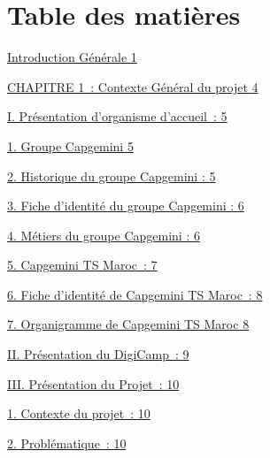 \documentclass[12pt,a4paper,twoside]{report}
\begin{document}
\hypertarget{table-des-matiuxe8res}{%
\section{Table des matières}\label{table-des-matiuxe8res}}

\protect\hyperlink{introduction-guxe9nuxe9rale}{Introduction Générale
\protect\hyperlink{introduction-guxe9nuxe9rale}{1}}

\protect\hyperlink{section}{CHAPITRE 1~: Contexte Général du projet
\protect\hyperlink{section}{4}}

\protect\hyperlink{pruxe9sentation-dorganisme-daccueil}{I. Présentation
d'organisme d'accueil~:
\protect\hyperlink{pruxe9sentation-dorganisme-daccueil}{5}}

\protect\hyperlink{groupe-capgemini}{1. Groupe Capgemini
\protect\hyperlink{groupe-capgemini}{5}}

\protect\hyperlink{_Toc204179669}{2. Historique du groupe Capgemini :
\protect\hyperlink{_Toc204179669}{5}}

\protect\hyperlink{fiche-didentituxe9-du-groupe-capgemini}{3. Fiche
d'identité du groupe Capgemini :
\protect\hyperlink{fiche-didentituxe9-du-groupe-capgemini}{6}}

\protect\hyperlink{muxe9tiers-du-groupe-capgemini}{4. Métiers du groupe
Capgemini : \protect\hyperlink{muxe9tiers-du-groupe-capgemini}{6}}

\protect\hyperlink{capgemini-ts-maroc}{5. Capgemini TS Maroc~:
\protect\hyperlink{capgemini-ts-maroc}{7}}

\protect\hyperlink{fiche-didentituxe9-de-capgemini-ts-maroc}{6. Fiche
d'identité de Capgemini TS Maroc~:
\protect\hyperlink{fiche-didentituxe9-de-capgemini-ts-maroc}{8}}

\protect\hyperlink{organigramme-de-capgemini-ts-maroc}{7. Organigramme
de Capgemini TS Maroc
\protect\hyperlink{organigramme-de-capgemini-ts-maroc}{8}}

\protect\hyperlink{pruxe9sentation-du-digicamp}{II. Présentation du
DigiCamp~: \protect\hyperlink{pruxe9sentation-du-digicamp}{9}}

\protect\hyperlink{pruxe9sentation-du-projet}{III. Présentation du
Projet~: \protect\hyperlink{pruxe9sentation-du-projet}{10}}

\protect\hyperlink{contexte-du-projet}{1. Contexte du projet~:
\protect\hyperlink{contexte-du-projet}{10}}

\protect\hyperlink{probluxe9matique}{2. Problématique~:
\protect\hyperlink{probluxe9matique}{10}}
\end{document}
